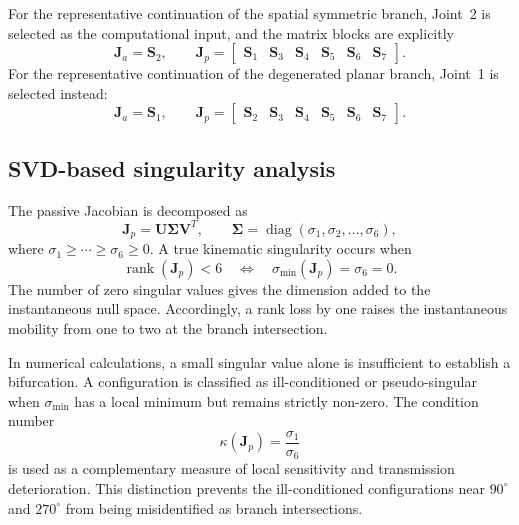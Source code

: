 \documentclass[a4paper,fleqn]{cas-sc}
\begin{document}
For the representative continuation of the spatial symmetric branch,
Joint~2 is selected as the computational input, and the matrix blocks are
explicitly
\begin{equation}
\mathbf J_a=\mathbf S_2,\qquad
\mathbf J_p=
\begin{bmatrix}
\mathbf S_1&\mathbf S_3&\mathbf S_4&
\mathbf S_5&\mathbf S_6&\mathbf S_7
\end{bmatrix}.
\label{eq:jacobian_partition_q2}
\end{equation}
For the representative continuation of the degenerated planar branch,
Joint~1 is selected instead:
\begin{equation}
\mathbf J_a=\mathbf S_1,\qquad
\mathbf J_p=
\begin{bmatrix}
\mathbf S_2&\mathbf S_3&\mathbf S_4&
\mathbf S_5&\mathbf S_6&\mathbf S_7
\end{bmatrix}.
\label{eq:jacobian_partition_q1}
\end{equation}

\subsection{SVD-based singularity analysis}

The passive Jacobian is decomposed as
\begin{equation}
\mathbf J_p=\mathbf U\boldsymbol{\Sigma}\mathbf V^T,\qquad
\boldsymbol{\Sigma}=\operatorname{diag}
(\sigma_1,\sigma_2,\ldots,\sigma_6),
\label{eq:svd}
\end{equation}
where \(\sigma_1\geq\cdots\geq\sigma_6\geq0\). A true kinematic singularity
occurs when
\begin{equation}
\operatorname{rank}(\mathbf J_p)<6
\quad\Longleftrightarrow\quad
\sigma_{\min}(\mathbf J_p)=\sigma_6=0.
\label{eq:singularity_criterion}
\end{equation}
The number of zero singular values gives the dimension added to the
instantaneous null space. Accordingly, a rank loss by one raises the
instantaneous mobility from one to two at the branch intersection.

In numerical calculations, a small singular value alone is insufficient to
establish a bifurcation. A configuration is classified as ill-conditioned or
pseudo-singular when \(\sigma_{\min}\) has a local minimum but remains
strictly non-zero. The condition number
\begin{equation}
\kappa(\mathbf J_p)=\frac{\sigma_1}{\sigma_6}
\end{equation}
is used as a complementary measure of local sensitivity and transmission
deterioration. This distinction prevents the ill-conditioned configurations
near \(90^\circ\) and \(270^\circ\) from being misidentified as branch
intersections.
\end{document}
